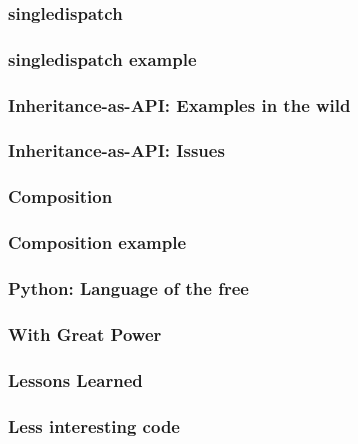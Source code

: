 \begin{frame}[fragile]
\frametitle{singledispatch}
\end{frame}

\begin{frame}[fragile]
\frametitle{singledispatch example}
\end{frame}

\begin{frame}[fragile]
\frametitle{Inheritance-as-API: Examples in the wild}
\end{frame}

\begin{frame}[fragile]
\frametitle{Inheritance-as-API: Issues}
\end{frame}

\begin{frame}[fragile]
\frametitle{Composition}
\end{frame}

\begin{frame}[fragile]
\frametitle{Composition example}
\end{frame}

\begin{frame}[fragile]
\frametitle{Python: Language of the free}
\end{frame}

\begin{frame}[fragile]
\frametitle{With Great Power}
\end{frame}

\begin{frame}[fragile]
\frametitle{Lessons Learned}
\end{frame}

\begin{frame}[fragile]
\frametitle{Less interesting code}
\end{frame}


